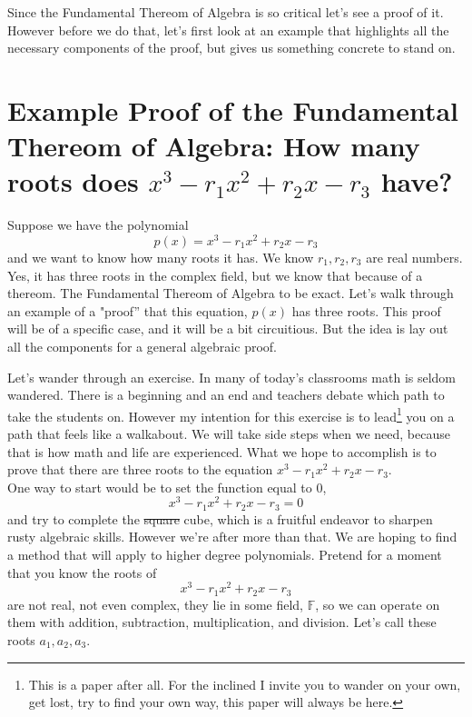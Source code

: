 \documentclass[12pt]{article}
\begin{document}
Since the Fundamental Thereom of Algebra is so critical let's see a proof of it.  However before we do that, let's first look at an example that highlights all the necessary components of the proof, but gives us something concrete to stand on.












\section*{Example Proof of the Fundamental Thereom of Algebra: How many roots does $x^3 -r_1 x^2 +r_2 x - r_3$ have?}
Suppose we have the polynomial $$p(x) = x^3 -r_1 x^2 +r_2 x - r_3$$ and we want to know how many roots it has.  We know $r_1, r_2, r_3$ are real numbers.  Yes, it has three roots in the complex field, but we know that because of a thereom.  The Fundamental Thereom of Algebra to be exact.  Let's walk through an example of a "proof'' that this equation, $p(x)$ has three roots.  This proof will be of a specific case, and it will be a bit circuitious.  But the idea is lay out all the components for a general algebraic proof.

Let's wander through an exercise.  In many of today's classrooms math is seldom wandered.  There is a beginning and an end and teachers debate which path to take the students on.  However my intention for this exercise is to lead\footnote{This is a paper after all.  For the inclined I invite you to wander on your own, get lost, try to find your own way, this paper will always be here.} you on a path that feels like a walkabout.  We will take side steps when we need, because that is how math and life are experienced.  What we hope to accomplish is to prove that there are three roots to the equation $x^3 -r_1 x^2 +r_2 x - r_3$.\\

One way to start would be to set the function equal to 0,  
$$x^3 -r_1 x^2 +r_2 x - r_3 =0$$ 
and try to complete the \sout{square} cube,  which is a fruitful endeavor to sharpen rusty algebraic skills.  However we're after more than that.  We are hoping to find a method that will apply to higher degree polynomials.  Pretend for a moment that you know the roots of  
$$x^3 -r_1 x^2 +r_2 x - r_3$$ 
are not real, not even complex, they lie in some field, $\mathbb{F}$, so we can operate on them with addition, subtraction, multiplication, and division.  Let's call these roots $a_1, a_2, a_3$.  
\end{document}
